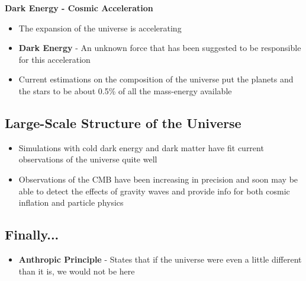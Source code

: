 \textbf{Dark Energy - Cosmic Acceleration}
\begin{itemize}
    \item The expansion of the universe is accelerating 
    \item \textbf{Dark Energy} - An unknown force that has been suggested to be responsible for this acceleration
    \item Current estimations on the composition of the universe put the planets and the stars to be about 0.5\% of all the mass-energy available
\end{itemize}

\subsection{Large-Scale Structure of the Universe}
\begin{itemize}
    \item Simulations with cold dark energy and dark matter have fit current observations of the universe quite well
    \item Observations of the CMB have been increasing in precision and soon may be able to detect the effects of gravity waves and provide info for both cosmic inflation and particle physics
\end{itemize}

\subsection{Finally...}
\begin{itemize}
    \item \textbf{Anthropic Principle} - States that if the universe were even a little different than it is, we would not be here
\end{itemize}

\newpage